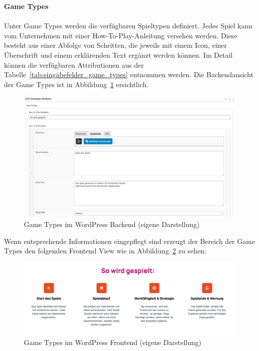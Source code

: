 \newpage
\textbf{Game Types}\\\\
Unter Game Types werden die verfügbaren Spieltypen definiert.
Jedes Spiel kann vom Unternehmen mit einer \glqq How-To-Play\grqq{}-Anleitung versehen werden.
Diese besteht aus einer Abfolge von Schritten, die jeweils mit einem Icon, einer Überschrift und einem erklärenden Text ergänzt werden können.
Im Detail können die verfügbaren Attributionen aus der Tabelle~\ref{tab:eingabefelder_game_types} entnommen werden.
Die Backendansicht der Game Types ist in Abbildung~\ref{fig:game-types-settings-legacy} ersichtlich.
\begin{figure}[H]
    \centering
    \includegraphics[width=1\textwidth]{images/legacy_game_types_backend}
    \caption{Game Types im WordPress Backend (eigene Darstellung)}
    \label{fig:game-types-settings-legacy}
\end{figure}
Wenn entsprechende Informationen eingepflegt sind erzeugt der Bereich der Game Types den folgenden Frontend View wie in Abbildung~\ref{fig:game-types-frontend-legacy} zu sehen:
\begin{figure}[H]
    \centering
    \includegraphics[width=1\textwidth]{images/legacy_game_types_frontend}
    \caption{Game Types im WordPress Frontend (eigene Darstellung)}
    \label{fig:game-types-frontend-legacy}
\end{figure}

